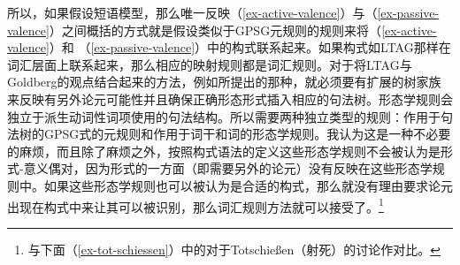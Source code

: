 \begin{exe}
\begin{xlist}[iv.]
\begin{exe}
\begin{xlist}[iv.]
所以，如果假设短语模型，那么唯一反映（\ref{ex-active-valence}）与（\ref{ex-passive-valence}）之间概括的方式就是假设类似于GPSG元规则的规则来将（\ref{ex-active-valence}）和 （\ref{ex-passive-valence}）中的构式联系起来。如果构式如LTAG那样在词汇层面上联系起来，那么相应的映射规则都是词汇规则。对于将LTAG与Goldberg的观点结合起来的方法，例如\citet{KO2012a}所提出的那种，就必须要有扩展的树家族来反映有另外论元可能性并且确保正确形态形式插入相应的句法树。形态学规则会独立于派生动词性词项使用的句法结构。所以需要两种独立类型的规则：作用于句法树的GPSG式的元规则和作用于词干和词的形态学规则。我认为这是一种不必要的麻烦，而且除了麻烦之外，按照构式语法的定义这些形态学规则不会被认为是形式-意义偶对，因为形式的一方面（即需要另外的论元）没有反映在这些形态学规则中。如果这些形态学规则也可以被认为是合适的构式，那么就没有理由要求论元出现在构式中来让其可以被识别，那么词汇规则方法就可以接受了。\footnote{
与下面（\ref{ex-tot-schiessen}）中的对于Totschießen（射死）的讨论作对比。%
}


\end{xlist}
\end{exe}
\end{xlist}
\end{exe}
